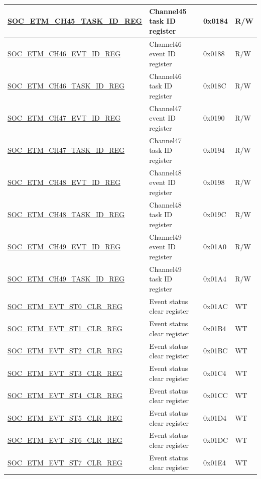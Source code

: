 \begin{longtable}{ | p{6cm} | p{6.4cm} | p{1.3cm} | p{1.8cm} | }
\hyperref[regdesc:SOCETMCH0TASKIDREG]{SOC\_ETM\_CH45\_TASK\_ID\_REG} & Channel45 task ID register & 0x0184 & R/W \\ \hline
\hyperref[regdesc:SOCETMCH0EVTIDREG]{SOC\_ETM\_CH46\_EVT\_ID\_REG} & Channel46 event ID register & 0x0188 & R/W \\ \hline
\hyperref[regdesc:SOCETMCH0TASKIDREG]{SOC\_ETM\_CH46\_TASK\_ID\_REG} & Channel46 task ID register & 0x018C & R/W \\ \hline
\hyperref[regdesc:SOCETMCH0EVTIDREG]{SOC\_ETM\_CH47\_EVT\_ID\_REG} & Channel47 event ID register & 0x0190 & R/W \\ \hline
\hyperref[regdesc:SOCETMCH0TASKIDREG]{SOC\_ETM\_CH47\_TASK\_ID\_REG} & Channel47 task ID register & 0x0194 & R/W \\ \hline
\hyperref[regdesc:SOCETMCH0EVTIDREG]{SOC\_ETM\_CH48\_EVT\_ID\_REG} & Channel48 event ID register & 0x0198 & R/W \\ \hline
\hyperref[regdesc:SOCETMCH0TASKIDREG]{SOC\_ETM\_CH48\_TASK\_ID\_REG} & Channel48 task ID register & 0x019C & R/W \\ \hline
\hyperref[regdesc:SOCETMCH0EVTIDREG]{SOC\_ETM\_CH49\_EVT\_ID\_REG} & Channel49 event ID register & 0x01A0 & R/W \\ \hline
\hyperref[regdesc:SOCETMCH0TASKIDREG]{SOC\_ETM\_CH49\_TASK\_ID\_REG} & Channel49 task ID register & 0x01A4 & R/W \\ \hline
\hyperref[regdesc:SOCETMEVTST0CLRREG]{SOC\_ETM\_EVT\_ST0\_CLR\_REG} & Event status clear register & 0x01AC & WT \\ \hline
\hyperref[regdesc:SOCETMEVTST1CLRREG]{SOC\_ETM\_EVT\_ST1\_CLR\_REG} & Event status clear register & 0x01B4 & WT \\ \hline
\hyperref[regdesc:SOCETMEVTST2CLRREG]{SOC\_ETM\_EVT\_ST2\_CLR\_REG} & Event status clear register & 0x01BC & WT \\ \hline
\hyperref[regdesc:SOCETMEVTST3CLRREG]{SOC\_ETM\_EVT\_ST3\_CLR\_REG} & Event status clear register & 0x01C4 & WT \\ \hline
\hyperref[regdesc:SOCETMEVTST4CLRREG]{SOC\_ETM\_EVT\_ST4\_CLR\_REG} & Event status clear register & 0x01CC & WT \\ \hline
\hyperref[regdesc:SOCETMEVTST5CLRREG]{SOC\_ETM\_EVT\_ST5\_CLR\_REG} & Event status clear register & 0x01D4 & WT \\ \hline
\hyperref[regdesc:SOCETMEVTST6CLRREG]{SOC\_ETM\_EVT\_ST6\_CLR\_REG} & Event status clear register & 0x01DC & WT \\ \hline
\hyperref[regdesc:SOCETMEVTST7CLRREG]{SOC\_ETM\_EVT\_ST7\_CLR\_REG} & Event status clear register & 0x01E4 & WT \\ \hline

\end{longtable}

